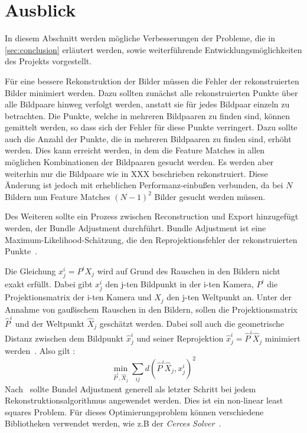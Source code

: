 \chapter{Ausblick}
\label{sec:outlook}

In diesem Abschnitt werden mögliche Verbesserungen der Probleme, die in \cref{sec:conclusion} erläutert werden, sowie weiterführende Entwicklungsmöglichkeiten des Projekts vorgestellt.

Für eine bessere Rekonstruktion der Bilder müssen die Fehler der rekonstruierten Bilder minimiert werden.
Dazu sollten zunächst alle rekonstruierten Punkte über alle Bildpaare hinweg verfolgt werden, anstatt sie für jedes Bildpaar einzeln zu betrachten.
Die Punkte, welche in mehreren Bildpaaren zu finden sind, können gemittelt werden, so dass sich der Fehler für diese Punkte verringert.
Dazu sollte auch die Anzahl der Punkte, die in mehreren Bildpaaren zu finden sind, erhöht werden.
Dies kann erreicht werden, in dem die Feature Matches in allen möglichen Kombinationen der Bildpaaren gesucht werden.
Es werden aber weiterhin nur die Bildpaare wie in XXX beschrieben rekonstruiert.
Diese Änderung ist jedoch mit erheblichen Performanz-einbußen verbunden, da bei $N$ Bildern nun Feature Matches $(N-1)^2$ Bilder gesucht werden müssen. 

Des Weiteren sollte ein Prozess zwischen Reconstruction und Export hinzugefügt werden, der Bundle Adjustment durchführt. 
Bundle Adjustment ist eine Maximum-Likelihood-Schätzung, die den Reprojektionsfehler der rekonstruierten Punkte~\cite[Kapitel 18.1]{hartley_2003}.

Die Gleichung $x^i_j = P^iX_j$ wird auf Grund des Rauschen in den Bildern nicht exakt erfüllt.
Dabei gibt $x^i_j$ den j-ten Bildpunkt in der i-ten Kamera, $P^i$ die Projektionsmatrix der i-ten Kamera und $X_j$ den j-ten Weltpunkt an.
Unter der Annahme von gaußischem Rauschen in den Bildern, sollen die Projektionsmatrix $\hat{P}^i$ und der Weltpunkt $\hat{X}_j$ geschätzt werden.
Dabei soll auch die geometrische Distanz zwischen dem Bildpunkt $\hat{x}^i_j$ und seiner Reprojektion $\hat{x}^i_j = \hat{P}^i\hat{X}_j$ minimiert werden~\cite[Kapitel 18.1]{hartley_2003}.
Also gilt \cite[Equation 18.1]{hartley_2003}:
\[\min_{\hat{P}^i,\hat{X}_j}\sum_{ij}d(\hat{P}^i\hat{X}_j,x^i_j)^2\]
Nach~\cite[Kapitel 18.1]{hartley_2003} sollte Bundel Adjustment generell als letzter Schritt bei jedem Rekonstruktionsalgorithmus angewendet werden.
Dies ist ein non-linear least squares Problem. %
Für dieses Optimierungsproblem können verschiedene Bibliotheken verwendet werden, wie z.B der \emph{Cerces Solver}~\cite{cerces-solver}.
 
